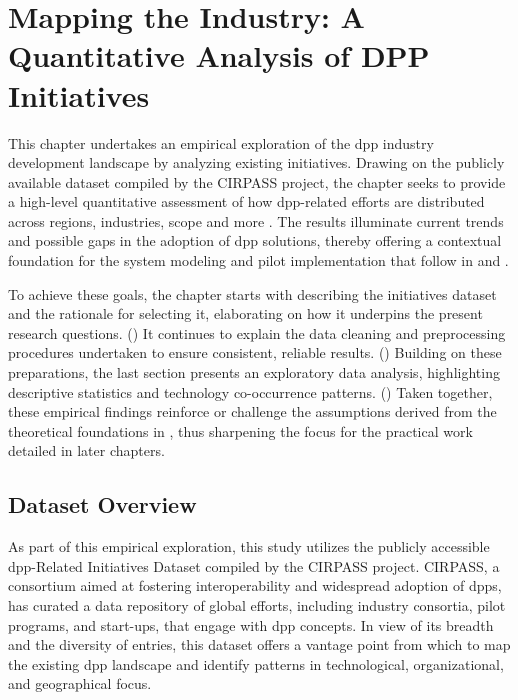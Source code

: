 \chapter{Mapping the Industry: A Quantitative Analysis of DPP Initiatives}
\label{cha:chapter_3}

This chapter undertakes an empirical exploration of the \acrlong{dpp} industry development landscape by analyzing existing initiatives. Drawing on the publicly available dataset compiled by the CIRPASS project, the chapter seeks to provide a high-level quantitative assessment of how \ac{dpp}-related efforts are distributed across regions, industries, scope and more \autocite{CIRPASS.2024}. The results illuminate current trends and possible gaps in the adoption of \ac{dpp} solutions, thereby offering a contextual foundation for the system modeling and pilot implementation that follow in  and .

To achieve these goals, the chapter starts with describing the initiatives dataset and the rationale for selecting it, elaborating on how it underpins the present research questions. () It continues to explain the data cleaning and preprocessing procedures undertaken to ensure consistent, reliable results. () Building on these preparations, the last section presents an exploratory data analysis, highlighting descriptive statistics and technology co-occurrence patterns. () Taken together, these empirical findings reinforce or challenge the assumptions derived from the theoretical foundations in , thus sharpening the focus for the practical work detailed in later chapters.

\section{Dataset Overview}
\label{sec:dataset_overview}
As part of this empirical exploration, this study utilizes the publicly accessible \ac{dpp}-Related Initiatives Dataset compiled by the CIRPASS project. CIRPASS, a consortium aimed at fostering interoperability and widespread adoption of \ac{dpp}s, has curated a data repository of global efforts, including industry consortia, pilot programs, and start-ups, that engage with \ac{dpp} concepts. In view of its breadth and the diversity of entries, this dataset offers a vantage point from which to map the existing \ac{dpp} landscape and identify patterns in technological, organizational, and geographical focus. \autocite{CIRPASS.2024}

